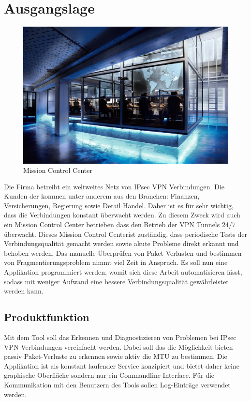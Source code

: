 \section{Ausgangslage}
\label{sec:Ausgangslage}

\begin{figure}
  \begin{center}
    \includegraphics[clip,scale=0.15]{mainpart/anforderungen/img/gallery_mc_01}
    \caption{Mission Control Center}
  \end{center}
\end{figure}

Die Firma \osag betreibt ein weltweites Netz von \acs{IPsec} \acs{VPN} Verbindungen. Die Kunden der \osag kommen unter anderem aus den Branchen: Finanzen, Versicherungen, Regierung sowie Detail Handel. Daher ist es für \osag sehr wichtig, dass die Verbindungen konstant überwacht werden. Zu diesem Zweck wird auch ein Mission Control Center betrieben dass den Betrieb der \acs{VPN} Tunnels 24/7 überwacht. Dieses Mission Control Center\footnotemark[1] ist zuständig, dass periodische Tests der Verbindungsqualität gemacht werden sowie akute Probleme direkt erkannt und behoben werden. Das manuelle Überprüfen von Paket-Verlusten und bestimmen von Fragmentierungsproblem nimmt viel Zeit in Anspruch. Es soll nun eine Applikation programmiert werden, womit sich diese Arbeit automatisieren lässt, sodass mit weniger Aufwand eine bessere Verbindungsqualität gewährleistet werden kann.


\subsection{Produktfunktion}
Mit dem Tool soll das Erkennen und Diagnostizieren von Problemen bei \acs{IPsec} \acs{VPN} Verbindungen vereinfacht werden. Dabei soll das \tool{} die Möglichkeit bieten passiv Paket-Verluste zu erkennen sowie aktiv die \acs{MTU} zu bestimmen. Die Applikation ist als konstant laufender Service konzipiert und bietet daher keine graphische Oberfläche sondern nur ein Commandline-Interface. Für die Kommunikation mit den Benutzern des Tools sollen Log-Einträge verwendet werden.

